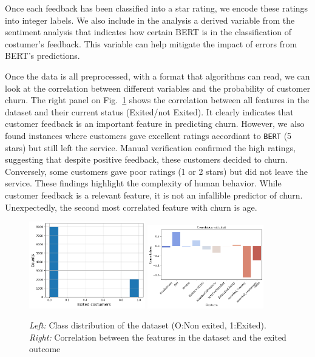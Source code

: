 \documentclass[12pt]{article}
\begin{document}
Once each feedback has been classified into a star rating, we encode these ratings into integer labels. We also include in the analysis a derived variable from the sentiment analysis that indicates how certain BERT is in the classification of costumer's feedback. This variable can help mitigate the impact of errors from BERT's predictions.

Once the data is all preprocessed, with a format that algorithms can read, we can look at the correlation between different variables and the probability of customer churn. The right panel on Fig.~\ref{fig:class_distribution} shows the correlation between all features in the dataset and their current status (Exited/not Exited). It clearly indicates that customer feedback is an important feature in predicting churn. However, we also found instances where customers gave excellent ratings accordiant to \texttt{BERT} (5 stars) but still left the service. Manual verification confirmed the high ratings, suggesting that despite positive feedback, these customers decided to churn. Conversely, some customers gave poor ratings (1 or 2 stars) but did not leave the service. These findings highlight the complexity of human behavior. While customer feedback is a relevant feature, it is not an infallible predictor of churn. Unexpectedly, the second most correlated feature with churn is age. 

\begin{figure}[h!]
    \centering
    \includegraphics[width=0.45\textwidth]{figures/class_distribution.png}
    \includegraphics[width=0.45\textwidth]{figures/correlation_matrix.png}
    \caption{\emph{Left:} Class distribution of the dataset (O:Non exited, 1:Exited). \emph{Right:} Correlation between the features in the dataset and the exited outcome}
    \label{fig:class_distribution}
\end{figure}
\end{document}
